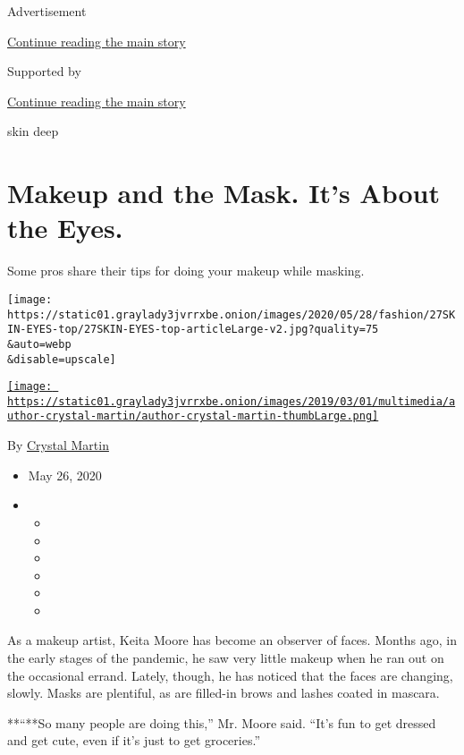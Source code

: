 Advertisement

\protect\hyperlink{after-top}{Continue reading the main story}

Supported by

\protect\hyperlink{after-sponsor}{Continue reading the main story}

skin deep

\hypertarget{makeup-and-the-mask-its-about-the-eyes}{%
\section{Makeup and the Mask. It's About the
Eyes.}\label{makeup-and-the-mask-its-about-the-eyes}}

Some pros share their tips for doing your makeup while masking.

\texttt{[image: https://static01.graylady3jvrrxbe.onion/images/2020/05/28/fashion/27SKIN-EYES-top/27SKIN-EYES-top-articleLarge-v2.jpg?quality=75\\\&auto=webp\\\&disable=upscale]}

\href{https://www.nytimes3xbfgragh.onion/by/crystal-martin}{\texttt{[image: https://static01.graylady3jvrrxbe.onion/images/2019/03/01/multimedia/author-crystal-martin/author-crystal-martin-thumbLarge.png]}}

By \href{https://www.nytimes3xbfgragh.onion/by/crystal-martin}{Crystal
Martin}

\begin{itemize}
\item
  May 26, 2020
\item
  \begin{itemize}
  \item
  \item
  \item
  \item
  \item
  \item
  \end{itemize}
\end{itemize}

As a makeup artist, Keita Moore has become an observer of faces. Months
ago, in the early stages of the pandemic, he saw very little makeup when
he ran out on the occasional errand. Lately, though, he has noticed that
the faces are changing, slowly. Masks are plentiful, as are filled-in
brows and lashes coated in mascara.

**``**So many people are doing this,'' Mr. Moore said. ``It's fun to get
dressed and get cute, even if it's just to get groceries.''

